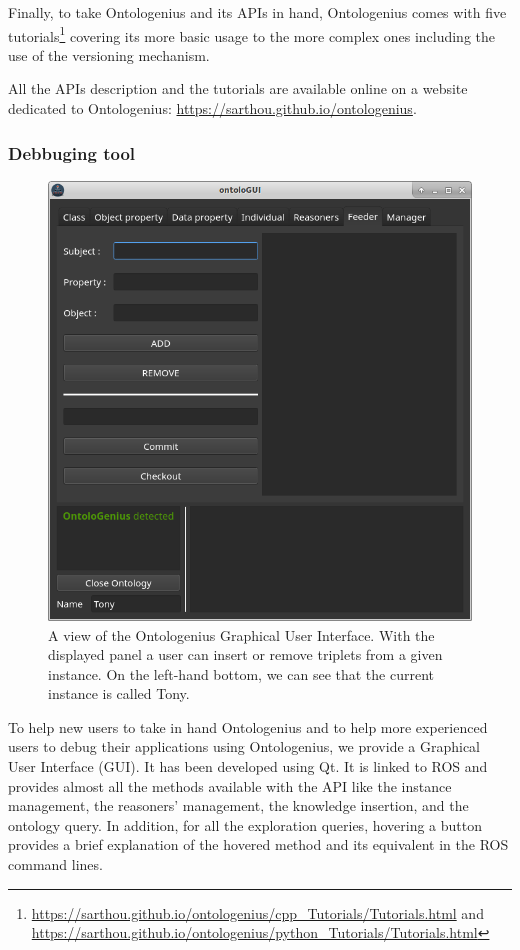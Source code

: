 Finally, to take Ontologenius and its APIs in hand, Ontologenius comes with five tutorials\footnote{\url{https://sarthou.github.io/ontologenius/cpp_Tutorials/Tutorials.html} and \url{https://sarthou.github.io/ontologenius/python_Tutorials/Tutorials.html}} covering its more basic usage to the more complex ones including the use of the versioning mechanism.

All the APIs description and the tutorials are available online on a website dedicated to Ontologenius: \url{https://sarthou.github.io/ontologenius}.

\subsubsection{Debbuging tool}

\begin{figure}[ht!]
\centering
\includegraphics[scale=0.48]{figures/chapter2/ontologui.png}
\caption{\label{fig:chap2_ontologui} A view of the Ontologenius Graphical User Interface. With the displayed panel a user can insert or remove triplets from a given instance. On the left-hand bottom, we can see that the current instance is called Tony.}
\end{figure}

To help new users to take in hand Ontologenius and to help more experienced users to debug their applications using Ontologenius, we provide a Graphical User Interface (GUI). It has been developed using Qt. It is linked to ROS and provides almost all the methods available with the API like the instance management, the reasoners' management, the knowledge insertion, and the ontology query. In addition, for all the exploration queries, hovering a button provides a brief explanation of the hovered method and its equivalent in the ROS command lines.

